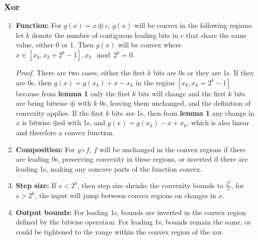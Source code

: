 \documentclass[11pt]{article}
\theoremstyle{definition}
\begin{document}
\subsubsection*{Xor}
\begin{enumerate}
\item \textbf{Function:} For $g(x) = x \oplus c$, $g(x)$ will be convex in the following regions: let $k$ denote the number of contiguous leading bits in $c$ that share the same value, either 0 or 1. Then $g(x)$ will be convex where $x \in [x_k, x_k + 2^k - 1], x_k \mod 2^k = 0$. 

{\it Proof.} There are two cases, either the first $k$ bits are 0s or they are 1s. If they are 0s, then $g(x) = g(x_k) + x - x_k$  in the region $[x_k, x_k = 2^k-1]$ because from \textbf{lemma 1} only the first $k$ bits will change and the first $k$ bits are being bitwise $\oplus$ with $k$ 0s, leaving them unchanged, and the definition of convexity applies. If the first $k$ bits are 1s, then from \textbf{lemma 1} any change in $x$ is bitwise $\oplus$ed with 1s, and $g(x) = g(x_k) - x + x_k$, which is also linear and therefore a convex function. 
\item \textbf{Composition:} For $g \circ f$, $f$ will be unchanged in the convex regions if there are leading 0s, preserving convexity in these regions, or inverted if there are leading 1s, making any concave parts of the function convex.
\item \textbf{Step size:} If $s < 2^k$, then step size shrinks the convexity bounds to $\frac{2^k}{s}$, for $s > 2^k$, the input will jump between convex regions on changes in $x$. 
\item \textbf{Output bounds:} For leading 1s, bounds are inverted in the convex region defined by the bitwise operation. For leading 1s, bounds remain the same, or could be tightened to the range within the convex region of the xor.
\end{enumerate}
\end{document}
